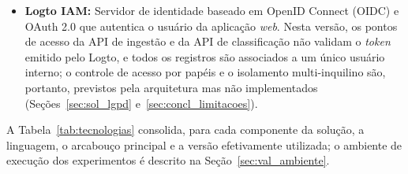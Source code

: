 \begin{itemize}
	\item \textbf{Logto IAM:} Servidor de identidade baseado em OpenID Connect (OIDC) e OAuth 2.0 que autentica o usuário da aplicação \textit{web}. Nesta versão, os pontos de acesso da API de ingestão e da API de classificação não validam o \textit{token} emitido pelo Logto, e todos os registros são associados a um único usuário interno; o controle de acesso por papéis e o isolamento multi-inquilino são, portanto, previstos pela arquitetura mas não implementados (Seções~\ref{sec:sol_lgpd} e~\ref{sec:concl_limitacoes}).
\end{itemize}

A Tabela~\ref{tab:tecnologias} consolida, para cada componente da solução, a linguagem, o arcabouço principal e a versão efetivamente utilizada; o ambiente de execução dos experimentos é descrito na Seção~\ref{sec:val_ambiente}.

